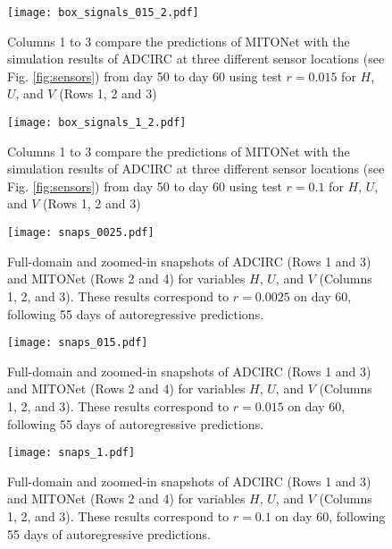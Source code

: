 \begin{figure}
    \centering
    \texttt{[image: box\_signals\_015\_2.pdf]}
    \caption{Columns 1 to 3 compare the predictions of MITONet with the simulation results of ADCIRC at three different sensor locations (see Fig. \ref{fig:sensors}) from day 50 to day 60 using test $r = 0.015$ for $H$, $U$, and $V$ (Rows 1, 2 and 3)}
    \label{fig:box_signals2}
\end{figure}

\begin{figure}
    \centering
    \texttt{[image: box\_signals\_1\_2.pdf]}
    \caption{Columns 1 to 3 compare the predictions of MITONet with the simulation results of ADCIRC at three different sensor locations (see Fig. \ref{fig:sensors}) from day 50 to day 60 using test $r = 0.1$ for $H$, $U$, and $V$ (Rows 1, 2 and 3)}
    \label{fig:box_signals3}
\end{figure}

\begin{figure}
    \centering
    \texttt{[image: snaps\_0025.pdf]}
    \caption{Full-domain and zoomed-in snapshots of ADCIRC (Rows 1 and 3) and MITONet (Rows 2 and 4) for variables $H$, $U$, and $V$ (Columns 1, 2, and 3). These results correspond to $r = 0.0025$ on day 60, following 55 days of autoregressive predictions.}
    \label{fig:rmse_snaps_0025_2}
\end{figure}

\begin{figure}
    \centering
    \texttt{[image: snaps\_015.pdf]}
    \caption{Full-domain and zoomed-in snapshots of ADCIRC (Rows 1 and 3) and MITONet (Rows 2 and 4) for variables $H$, $U$, and $V$ (Columns 1, 2, and 3). These results correspond to $r = 0.015$ on day 60, following 55 days of autoregressive predictions.}
    \label{fig:rmse_snaps_015_2}
\end{figure}

\begin{figure}
    \centering
    \texttt{[image: snaps\_1.pdf]}
    \caption{Full-domain and zoomed-in snapshots of ADCIRC (Rows 1 and 3) and MITONet (Rows 2 and 4) for variables $H$, $U$, and $V$ (Columns 1, 2, and 3). These results correspond to $r = 0.1$ on day 60, following 55 days of autoregressive predictions.}
    \label{fig:rmse_snaps_1_2}
\end{figure}
